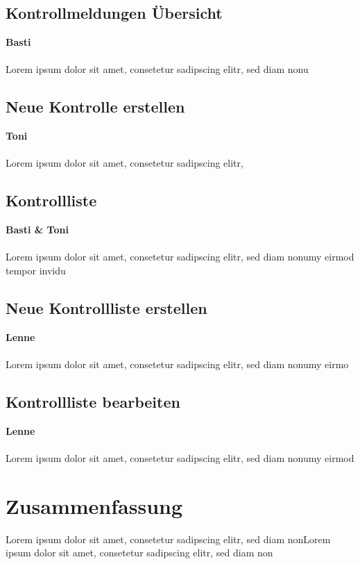 \documentclass[12pt]{article}
\begin{document}
\subsection{Kontrollmeldungen Übersicht} %
{\small \textbf{Basti}}
\\\\
Lorem ipsum dolor sit amet, consetetur sadipscing elitr, sed diam nonu

\subsection{Neue Kontrolle erstellen} %
{\small \textbf{Toni}}
\\\\
Lorem ipsum dolor sit amet, consetetur sadipscing elitr, 

\subsection{Kontrollliste} %
{\small \textbf{Basti \& Toni}}
\\\\
Lorem ipsum dolor sit amet, consetetur sadipscing elitr, sed diam nonumy eirmod tempor invidu

\subsection{Neue Kontrollliste erstellen} %
{\small \textbf{Lenne}}
\\\\
Lorem ipsum dolor sit amet, consetetur sadipscing elitr, sed diam nonumy eirmo

\subsection{Kontrollliste bearbeiten} %
{\small \textbf{Lenne}}
\\\\
Lorem ipsum dolor sit amet, consetetur sadipscing elitr, sed diam nonumy eirmod 

\section{Zusammenfassung}
Lorem ipsum dolor sit amet, consetetur sadipscing elitr, sed diam nonLorem ipsum dolor sit amet, consetetur sadipscing elitr, sed diam non

\clearpage
\end{document}
